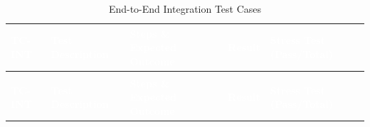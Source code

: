 \begin{longtable}{>{\bfseries}p{1.4cm} p{3.2cm} p{6.5cm} p{1.0cm} p{1.5cm}}
\caption{End-to-End Integration Test Cases}
\label{tab:tc-int} \\
 
\rowcolor{headerblue}
\textcolor{white}{\textbf{TC-INT}} &
\textcolor{white}{\textbf{Test Description}} &
\textcolor{white}{\textbf{Steps \& Expected Outcome}} &
\textcolor{white}{\textbf{Result}} &
\textcolor{white}{\textbf{Stress Test (Pass/Total)}} \\
\endfirsthead
 
\multicolumn{5}{c}{\tablename\ \thetable{} -- continued} \\
\rowcolor{headerblue}
\textcolor{white}{\textbf{TC-INT}} &
\textcolor{white}{\textbf{Test Description}} &
\textcolor{white}{\textbf{Steps \& Expected Outcome}} &
\textcolor{white}{\textbf{Result}} &
\textcolor{white}{\textbf{Stress Test (Pass/Total)}} \\
\endhead
 

\end{longtable}
